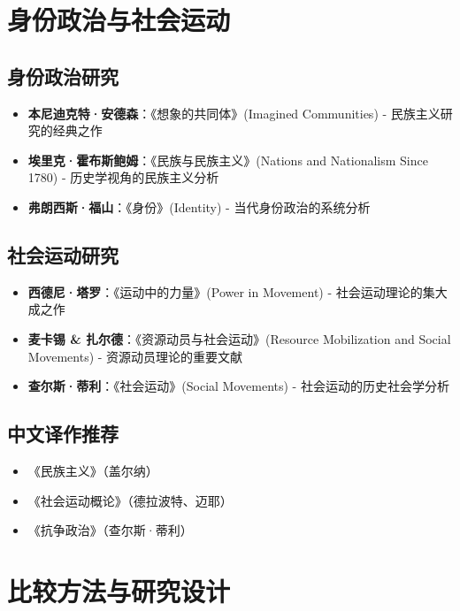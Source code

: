 \section{身份政治与社会运动}

\subsection{身份政治研究}
\begin{itemize}
    \item \textbf{本尼迪克特·安德森}：《想象的共同体》(Imagined Communities)
    \quad - 民族主义研究的经典之作
    \item \textbf{埃里克·霍布斯鲍姆}：《民族与民族主义》(Nations and Nationalism Since 1780)
    \quad - 历史学视角的民族主义分析
    \item \textbf{弗朗西斯·福山}：《身份》(Identity)
    \quad - 当代身份政治的系统分析
\end{itemize}

\subsection{社会运动研究}
\begin{itemize}
    \item \textbf{西德尼·塔罗}：《运动中的力量》(Power in Movement)
    \quad - 社会运动理论的集大成之作
    \item \textbf{麦卡锡 \& 扎尔德}：《资源动员与社会运动》(Resource Mobilization and Social Movements)
    \quad - 资源动员理论的重要文献
    \item \textbf{查尔斯·蒂利}：《社会运动》(Social Movements)
    \quad - 社会运动的历史社会学分析
\end{itemize}

\subsection{中文译作推荐}
\begin{itemize}
    \item 《民族主义》（盖尔纳）
    \item 《社会运动概论》（德拉波特、迈耶）
    \item 《抗争政治》（查尔斯·蒂利）
\end{itemize}

\section{比较方法与研究设计}

